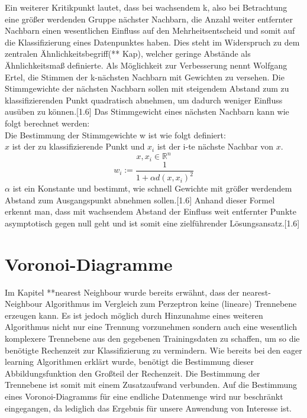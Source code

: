 \documentclass[fontsize=11pt]{scrartcl}
\begin{document}
                Ein weiterer Kritikpunkt lautet, dass bei wachsendem k, also bei Betrachtung eine größer werdenden Gruppe nächster Nachbarn, die Anzahl weiter entfernter Nachbarn einen wesentlichen Einfluss auf den Mehrheitsentscheid und somit auf die Klassifizierung eines Datenpunktes haben. Dies steht im Widerspruch zu dem zentralen Ähnlichkeitsbegriff(** Kap), welcher geringe Abstände als Ähnlichkeitsmaß definierte.
                Als Möglichkeit zur Verbesserung nennt Wolfgang Ertel, die Stimmen der k-nächsten Nachbarn mit Gewichten zu versehen. Die Stimmgewichte der nächsten Nachbarn sollen mit steigendem Abstand zum zu klassifizierenden Punkt quadratisch abnehmen, um dadurch weniger Einfluss ausüben zu können.[1.6]
                Das Stimmgewicht eines nächsten Nachbarn kann wie folgt berechnet werden:\\
                        
                Die Bestimmung der Stimmgewichte w ist wie folgt definiert:\\
                $x$ ist der zu klassifizierende Punkt und $x_i$ ist der i-te nächste Nachbar von $x$.
                $$
                    x,x_i \in \mathbb{R}^n
                $$
                $$
                    w_i:=\frac{1}{1+\alpha d(x,x_i)^2}
                $$
                $\alpha$ ist ein Konstante und bestimmt, wie schnell Gewichte mit größer werdendem Abstand zum Ausgangspunkt abnehmen sollen.[1.6] Anhand dieser Formel erkennt man, dass mit wachsendem Abstand der Einfluss weit entfernter Punkte asymptotisch gegen null geht und ist somit eine zielführender Lösungsansatz.[1.6]
        \section{Voronoi-Diagramme}
            Im Kapitel **nearest Neighbour wurde bereits erwähnt, dass der nearest-Neighbour Algorithmus im Vergleich zum Perzeptron keine (lineare) Trennebene erzeugen kann. Es ist jedoch möglich durch Hinzunahme eines weiteren Algorithmus nicht nur eine Trennung vorzunehmen sondern auch eine wesentlich komplexere Trennebene aus den gegebenen Trainingsdaten zu schaffen, um so die benötigte Rechenzeit zur Klassifizierung zu vermindern.
            Wie bereits bei den eager learning Algorithmen erklärt wurde, benötigt die Bestimmung dieser Abbildungsfunktion den Großteil der Rechenzeit. Die Bestimmung der Trennebene ist somit mit einem Zusatzaufwand verbunden. 
            Auf die Bestimmung eines Voronoi-Diagramms für eine endliche Datenmenge wird nur beschränkt eingegangen, da lediglich das Ergebnis für unsere Anwendung von Interesse ist.
                        
\end{document}
